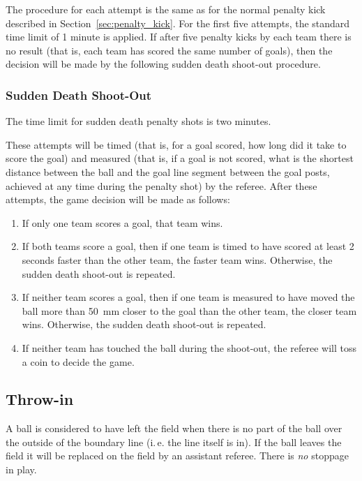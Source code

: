 \documentclass[12pt]{article}
\newcommand{\ie}{\mbox{i.\,e.}\xspace}
\begin{document}
The procedure for each attempt is the same as for the normal penalty kick described in Section~\ref{sec:penalty_kick}. For the first five attempts, the standard time limit of 1 minute is applied. If after five penalty kicks by each team there is no result (that is, each team has scored the same number of goals), then the decision will be made by the following sudden death shoot-out procedure.


\subsubsection{Sudden Death Shoot-Out}

The time limit for sudden death penalty shots is two minutes.

These attempts will be timed (that is, for a goal scored, how long did it take to score the goal) and measured (that is, if a goal is not scored, what is the shortest distance between the ball and the goal line segment between the goal posts, achieved at any time during the penalty shot) by the referee. After these attempts, the game decision will be made as follows:

\begin{enumerate}

\item If only one team scores a goal, that team wins.

\item If both teams score a goal, then if one team is timed to have scored at least 2 seconds faster than the other team, the faster team wins. Otherwise, the sudden death shoot-out is repeated.

\item If neither team scores a goal, then if one team is measured to have moved the ball more than 50~mm closer to the goal than the other team, the closer team wins. Otherwise, the sudden death shoot-out is repeated.

\item If neither team has touched the ball during the shoot-out, the referee will toss a coin to decide the game.

\end{enumerate}

\subsection{Throw-in}
\label{sec:throw_in}

A ball is considered to have left the field when there is no part of the ball over the outside of the boundary line (\ie the line itself is in). If the ball leaves the field it will be replaced on the field by an assistant referee. There is \emph{no} stoppage in play.
\end{document}
